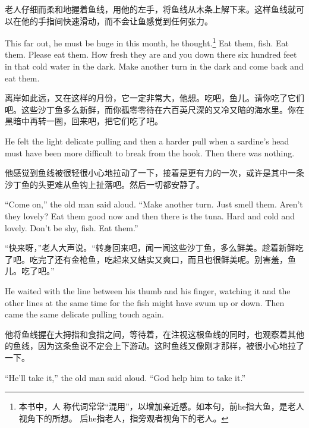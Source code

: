 \begin{paracol}{2}
\switchcolumn

老人仔细而柔和地握着鱼线，用他的左手，将鱼线从木条上解下来。这样鱼线就可以在他的手指间快速滑动，而不会让鱼感觉到任何张力。

\switchcolumn*

This far out, he must be huge in this month, he thought.\footnote{本书中，人
  称代词常常“混用”，以增加亲近感。如本句，前he指大鱼，是老人视角下的所想。
  后he指老人，指旁观者视角下的老人。} Eat them, fish. Eat them. Please eat
them. How fresh they are and you down there six hundred feet in that cold
water in the dark. Make another turn in the dark and come back and eat them.

\switchcolumn

离岸如此远，又在这样的月份，它一定非常大，他想。吃吧，鱼儿。请你吃了它们吧。这些沙丁鱼多么新鲜，而你孤零零待在六百英尺深的又冷又暗的海水里。你在黑暗中再转一圈，回来吧，把它们吃了吧。

\switchcolumn*

He felt the light delicate pulling and then a harder pull when a sardine's
head must have been more difficult to break from the hook. Then there was
nothing.

\switchcolumn

他感觉到鱼线被很轻很小心地拉动了一下，接着是更有力的一次，或许是其中一条沙丁鱼的头更难从鱼钩上扯落吧。然后一切都安静了。

\switchcolumn*

``Come on,'' the old man said aloud. ``Make another turn. Just smell them.
Aren't they lovely? Eat them good now and then there is the tuna. Hard and
cold and lovely. Don't be shy, fish. Eat them.''

\switchcolumn

“快来呀，”老人大声说。“转身回来吧，闻一闻这些沙丁鱼，多么鲜美。趁着新鲜吃了吧。吃完了还有金枪鱼，吃起来又结实又爽口，而且也很鲜美呢。别害羞，鱼儿。吃了吧。”

\switchcolumn*

He waited with the line between his thumb and his finger, watching it and
the other lines at the same time for the fish might have swum up or down.
Then came the same delicate pulling touch again.

\switchcolumn

他将鱼线握在大拇指和食指之间，等待着，在注视这根鱼线的同时，也观察着其他的鱼线，因为这条鱼说不定会上下游动。这时鱼线又像刚才那样，被很小心地拉了一下。

\switchcolumn*

``He'll take it,'' the old man said aloud. ``God help him to take it.''


\end{paracol}
